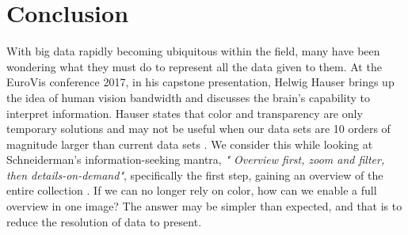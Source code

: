 
\section{Conclusion}
With big data rapidly becoming ubiquitous within the field, many have been wondering what they must do to represent all the data given to them. At the EuroVis conference 2017, in his capstone presentation, Helwig Hauser brings up the idea of human vision bandwidth and discusses the brain's capability to interpret information. Hauser states that color and transparency are only temporary solutions and may not be useful when our data sets are 10 orders of magnitude larger than current data sets \cite{hauser2019from}. We consider this while looking at Schneiderman's information-seeking mantra, \emph{" Overview first, zoom and filter, then details-on-demand"}, specifically the first step, gaining an overview of the entire collection \cite{shneiderman1996eyes}. If we can no longer rely on color, how can we enable a full overview in one image? The answer may be simpler than expected, and that is to reduce the resolution of data to present.


